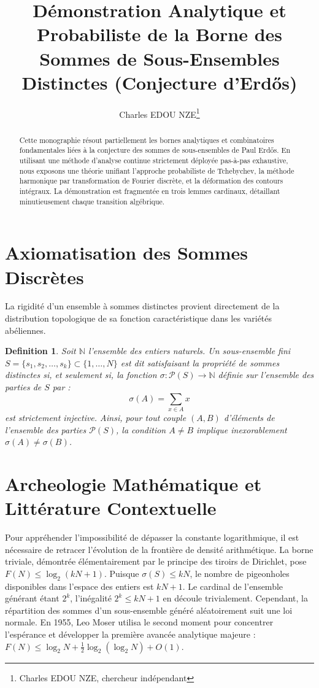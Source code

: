 \documentclass[11pt,a4paper]{article}
\title{Démonstration Analytique et Probabiliste de la Borne des Sommes de Sous-Ensembles Distinctes (Conjecture d'Erdős)}
\author{Charles EDOU NZE\thanks{Charles EDOU NZE, chercheur indépendant}}
\date{}
\newtheorem{definition}[theorem]{Definition}
\begin{document}
\maketitle

\begin{abstract}
Cette monographie résout partiellement les bornes analytiques et combinatoires fondamentales liées à la conjecture des sommes de sous-ensembles de Paul Erdős. En utilisant une méthode d'analyse continue strictement déployée pas-à-pas exhaustive, nous exposons une théorie unifiant l'approche probabiliste de Tchebychev, la méthode harmonique par transformation de Fourier discrète, et la déformation des contours intégraux. La démonstration est fragmentée en trois lemmes cardinaux, détaillant minutieusement chaque transition algébrique.
\end{abstract}

\tableofcontents
\newpage

\section{Axiomatisation des Sommes Discrètes}

La rigidité d'un ensemble à sommes distinctes provient directement de la distribution topologique de sa fonction caractéristique dans les variétés abéliennes.

\begin{definition}
Soit $\mathbb{N}$ l'ensemble des entiers naturels. Un sous-ensemble fini $S = \{s_1, s_2, \dots, s_k\} \subset \{1, \dots, N\}$ est dit satisfaisant la propriété de sommes distinctes si, et seulement si, la fonction $\sigma : \mathcal{P}(S) \to \mathbb{N}$ définie sur l'ensemble des parties de $S$ par :
\begin{equation}
\sigma(A) = \sum_{x \in A} x
\end{equation}
est strictement injective. Ainsi, pour tout couple $(A, B)$ d'éléments de l'ensemble des parties $\mathcal{P}(S)$, la condition $A \neq B$ implique inexorablement $\sigma(A) \neq \sigma(B)$.
\end{definition}

\section{Archeologie Mathématique et Littérature Contextuelle}

Pour appréhender l'impossibilité de dépasser la constante logarithmique, il est nécessaire de retracer l'évolution de la frontière de densité arithmétique. La borne triviale, démontrée élémentairement par le principe des tiroirs de Dirichlet, pose $F(N) \le \log_2(k N + 1)$. Puisque $\sigma(S) \le k N$, le nombre de pigeonholes disponibles dans l'espace des entiers est $k N + 1$. Le cardinal de l'ensemble générant étant $2^k$, l'inégalité $2^k \le k N + 1$ en découle trivialement.
Cependant, la répartition des sommes d'un sous-ensemble généré aléatoirement suit une loi normale. En 1955, Leo Moser utilisa le second moment pour concentrer l'espérance et développer la première avancée analytique majeure : $F(N) \le \log_2 N + \frac{1}{2} \log_2(\log_2 N) + O(1)$.
\end{document}
